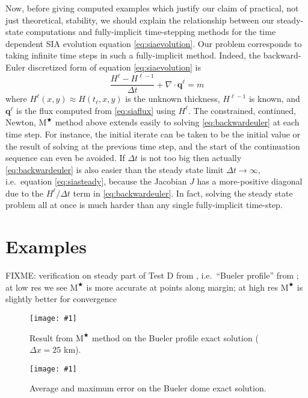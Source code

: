 \documentclass[twocolumn,letterpaper]{igs}
\newcommand{\onecol}[1]{\texttt{[image: \#1]}}
\newcommand\bq{\mathbf{q}}
\newcommand{\Div}{\nabla\cdot}
\newcommand{\Mstar}{$\text{M}^{\bigstar}$\xspace}
\begin{document}
Now, before giving computed examples which justify our claim of practical, not just theoretical, stability, we should explain the relationship between our steady-state computations and fully-implicit time-stepping methods for the time dependent SIA evolution equation \eqref{eq:siaevolution}.  Our problem corresponds to taking infinite time steps in such a fully-implicit method.  Indeed, the backward-Euler \citep{MortonMayers2005} discretized form of equation \eqref{eq:siaevolution} is
\begin{equation}
\frac{H^\ell - H^{\ell-1}}{\Delta t} + \Div \bq^\ell = m \label{eq:backwardeuler}
\end{equation}
where $H^\ell(x,y) \approx H(t_\ell,x,y)$ is the unknown thickness, $H^{\ell-1}$ is known, and $\bq^\ell$ is the flux computed from \eqref{eq:siaflux} using $H^\ell$.  The constrained, continued, Newton, \Mstar method above extends easily to solving \eqref{eq:backwardeuler} at each time step.  For instance, the initial iterate can be taken to be the initial value or the result of solving at the previous time step, and the start of the continuation sequence can even be avoided.  If $\Delta t$ is not too big then actually \eqref{eq:backwardeuler} is also easier than the steady state limit $\Delta t\to \infty$, i.e.~equation \eqref{eq:siasteady}, because the Jacobian $J$ has a more-positive diagonal due to the $H^\ell/\Delta t$ term in \eqref{eq:backwardeuler}.  In fact, solving the steady state problem all at once is much harder than any single fully-implicit time-step.

\section{Examples} \label{sec:examples}

FIXME: verification on steady part of Test D from \cite{Bueleretal2005}, i.e.~``Bueler profile'' from \cite{vanderVeen2013}; at low res we see \Mstar is more accurate at points along margin; at high res \Mstar is slightly better for convergence

\begin{figure}[ht]
\onecol{domeprofile.pdf}
\caption{Result from \Mstar method on the Bueler profile exact solution ($\Delta x=25$ km).}
\label{fig:domeprofile}
\end{figure}

\begin{figure}[ht]
\onecol{domeverif.pdf}
\caption{Average and maximum error on the Bueler dome exact solution.}
\label{fig:domeverif}
\end{figure}
\end{document}
